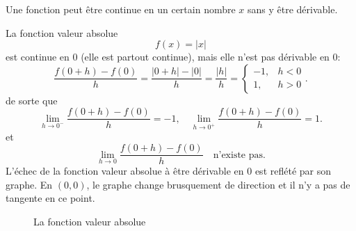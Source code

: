 \documentclass[a4paper,12pt]{article}
\begin{document}
Une fonction peut être continue en un certain nombre $x$ sans y être dérivable.
\begin{exemple}[label=ex:valabs]
	\tcblower
La fonction valeur absolue
$$f(x) = |x|$$
est continue en 0 (elle est partout continue), mais elle n'est pas dérivable en 0:
$$\dfrac{f(0+h) - f(0)}{h} = \dfrac{|0+h| - |0|}{h} = \dfrac{|h|}{h} = \begin{cases}
    -1, & h < 0 \\
    1, & h > 0 \end{cases}.$$
de sorte que
$$\displaystyle\lim_{h \to 0^-} \dfrac{f(0+h) - f(0)}{h} = -1, \quad \displaystyle\lim_{h \to 0^+} \dfrac{f(0+h) - f(0)}{h} = 1.$$
et
$$\displaystyle\lim_{h \to 0} \dfrac{f(0+h) - f(0)}{h} \quad \text{n'existe pas}.$$
L'échec de la fonction valeur absolue à être dérivable en 0 est reflété par son graphe. En $(0, 0)$, le graphe change brusquement de direction et il n'y a pas de tangente en ce point.

\end{exemple}
\begin{figure}[h]
    \centering
    \caption{La fonction valeur absolue}
\end{figure}
\end{document}
